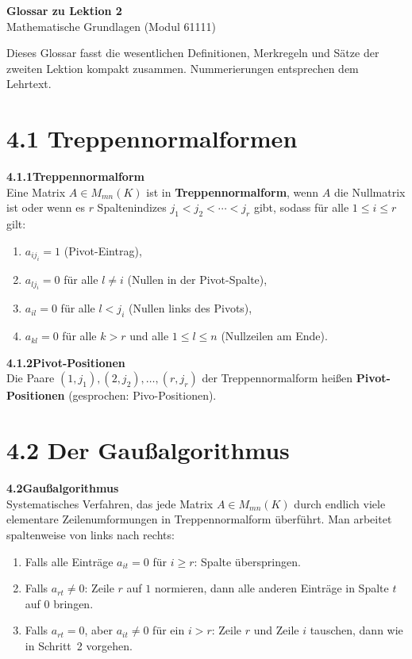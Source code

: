 \documentclass[a4paper,12pt]{article}
\newcommand{\gentry}[3]{%
  \noindent\textbf{#1\quad #2}\nopagebreak\\[0.2em]
  #3\par\smallskip
}
\begin{document}
\begin{center}
  {\LARGE\bfseries Glossar zu Lektion 2}\\[0.5em]
  {\large Mathematische Grundlagen (Modul 61111)}
\end{center}

\vspace{1em}

Dieses Glossar fasst die wesentlichen Definitionen, Merkregeln und Sätze der
zweiten Lektion kompakt zusammen. Nummerierungen entsprechen dem Lehrtext.

\section*{4.1 \quad Treppennormalformen}

\gentry{4.1.1}{Treppennormalform}{%
  Eine Matrix $A \in M_{mn}(K)$ ist in \textbf{Treppennormalform}, wenn $A$ die
  Nullmatrix ist oder wenn es $r$ Spaltenindizes $j_1 < j_2 < \cdots < j_r$ gibt,
  sodass für alle $1 \le i \le r$ gilt:
  \begin{enumerate}[label=(\roman*),topsep=2pt,itemsep=1pt]
    \item $a_{ij_i} = 1$ (Pivot-Eintrag),
    \item $a_{lj_i} = 0$ für alle $l \neq i$ (Nullen in der Pivot-Spalte),
    \item $a_{il} = 0$ für alle $l < j_i$ (Nullen links des Pivots),
    \item $a_{kl} = 0$ für alle $k > r$ und alle $1 \le l \le n$ (Nullzeilen am Ende).
  \end{enumerate}
}

\gentry{4.1.2}{Pivot-Positionen}{%
  Die Paare $(1,j_1),(2,j_2),\ldots,(r,j_r)$ der Treppennormalform heißen
  \textbf{Pivot-Positionen} (gesprochen: Pivo-Positionen).
}

\section*{4.2 \quad Der Gaußalgorithmus}

\gentry{4.2}{Gaußalgorithmus}{%
  Systematisches Verfahren, das jede Matrix $A \in M_{mn}(K)$ durch endlich
  viele elementare Zeilenumformungen in Treppennormalform überführt.
  Man arbeitet spaltenweise von links nach rechts:
  \begin{enumerate}[label=\arabic*.,topsep=2pt,itemsep=1pt]
    \item Falls alle Einträge $a_{it} = 0$ für $i \ge r$: Spalte überspringen.
    \item Falls $a_{rt} \neq 0$: Zeile $r$ auf $1$ normieren, dann alle anderen
          Einträge in Spalte $t$ auf $0$ bringen.
    \item Falls $a_{rt} = 0$, aber $a_{it} \neq 0$ für ein $i > r$:
          Zeile $r$ und Zeile $i$ tauschen, dann wie in Schritt~2 vorgehen.
  \end{enumerate}
}
\end{document}
